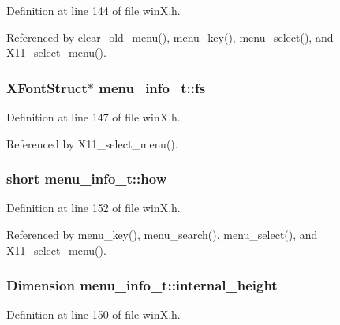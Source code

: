 Definition at line 144 of file win\+X.\+h.



Referenced by clear\+\_\+old\+\_\+menu(), menu\+\_\+key(), menu\+\_\+select(), and X11\+\_\+select\+\_\+menu().

\hypertarget{structmenu__info__t_a154f8896fd4e9c248cab6ec1f5006a49}{
\subsubsection[{fs}]{\setlength{\rightskip}{0pt plus 5cm}X\+Font\+Struct$\ast$ menu\+\_\+info\+\_\+t\+::fs}}\label{structmenu__info__t_a154f8896fd4e9c248cab6ec1f5006a49}


Definition at line 147 of file win\+X.\+h.



Referenced by X11\+\_\+select\+\_\+menu().

\hypertarget{structmenu__info__t_a96feb8d0ee474a21f1357ac961f0a5ab}{
\subsubsection[{how}]{\setlength{\rightskip}{0pt plus 5cm}short menu\+\_\+info\+\_\+t\+::how}}\label{structmenu__info__t_a96feb8d0ee474a21f1357ac961f0a5ab}


Definition at line 152 of file win\+X.\+h.



Referenced by menu\+\_\+key(), menu\+\_\+search(), menu\+\_\+select(), and X11\+\_\+select\+\_\+menu().

\hypertarget{structmenu__info__t_a0dea626d0109b30b18484e26a2c5733c}{
\subsubsection[{internal\+\_\+height}]{\setlength{\rightskip}{0pt plus 5cm}Dimension menu\+\_\+info\+\_\+t\+::internal\+\_\+height}}\label{structmenu__info__t_a0dea626d0109b30b18484e26a2c5733c}


Definition at line 150 of file win\+X.\+h.



